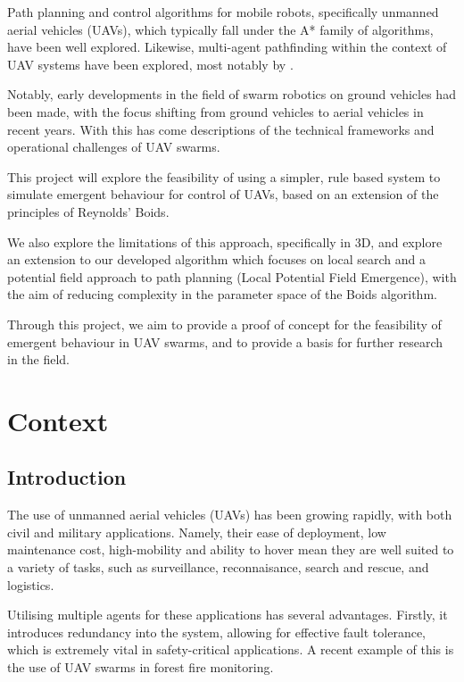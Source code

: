 \documentclass[12pt]{article}
\begin{document}
Path planning and control algorithms for mobile robots, specifically unmanned aerial vehicles (UAVs), which typically fall under the A* family of algorithms, have been well explored\cite{IJSAEM,Chen}. Likewise, multi-agent pathfinding within the context of UAV systems have been explored, most notably by \citet{burwell_2019}.

Notably, early developments in the field of swarm robotics on ground vehicles had been made\cite{Monada}, with the focus shifting from ground vehicles to aerial vehicles in recent years. With this has come descriptions of the technical frameworks\cite{Zhou} and operational challenges of UAV swarms\cite{Verdoucq}.

This project will explore the feasibility of using a simpler, rule based system to simulate emergent behaviour for control of UAVs, based on an extension of the principles of Reynolds' Boids\cite{Reynolds}.

We also explore the limitations of this approach, specifically in 3D, and explore an extension to our developed algorithm which focuses on local search and a potential field approach to path planning (Local Potential Field Emergence), with the aim of reducing complexity in the parameter space of the Boids algorithm.

Through this project, we aim to provide a proof of concept for the feasibility of emergent behaviour in UAV swarms, and to provide a basis for further research in the field.

\vspace{2cm}


\newpage

\section{Context}
\subsection{Introduction}
\label{sec:introduction}
The use of unmanned aerial vehicles (UAVs) has been growing rapidly, with both civil and military applications. Namely, their ease of deployment, low maintenance cost, high-mobility and ability to hover mean they are well suited to a variety of tasks, such as surveillance, reconnaisance, search and rescue, and logistics\cite{Hayat}.

Utilising multiple agents for these applications has several advantages. Firstly, it introduces redundancy into the system, allowing for effective fault tolerance, which is extremely vital in safety-critical applications\cite{Perez}. A recent example of this is the use of UAV swarms in forest fire monitoring\cite{Hu}.
\end{document}
